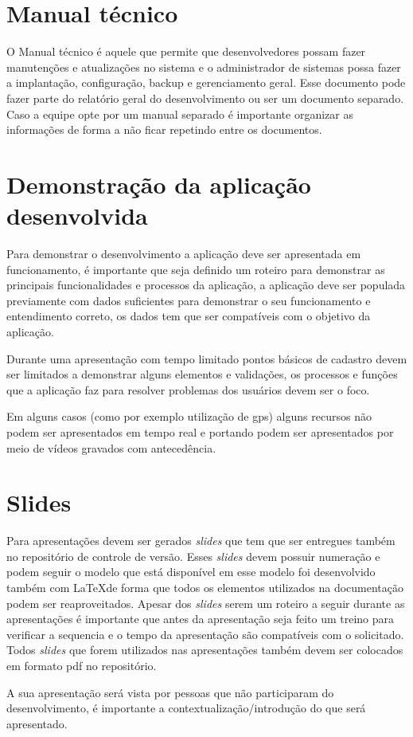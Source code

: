 \section{Manual técnico}\label{atv-manual-tecnico}

O Manual técnico é aquele que permite que desenvolvedores possam fazer manutenções e atualizações no sistema e o administrador de sistemas possa fazer a implantação, configuração, backup e gerenciamento geral. Esse documento pode fazer parte do relatório geral do desenvolvimento ou ser um documento separado. Caso a equipe opte por um manual separado é importante organizar as informações de forma a não ficar repetindo entre os documentos.



\section{Demonstração da aplicação desenvolvida}\label{atv-demonstracao-aplicacao}

Para demonstrar o desenvolvimento a aplicação deve ser apresentada em funcionamento, é importante que seja definido um roteiro para demonstrar as principais funcionalidades e processos da aplicação, a aplicação deve ser populada previamente com dados suficientes para demonstrar o seu funcionamento e entendimento correto, os dados tem que ser compatíveis com o objetivo da aplicação. 

Durante uma apresentação com tempo limitado pontos básicos de cadastro devem ser limitados a demonstrar alguns elementos e validações, os processos e funções que a aplicação faz para resolver problemas dos usuários devem ser o foco.

Em alguns casos (como por exemplo utilização de \ac{gps}) alguns recursos não podem ser apresentados em tempo real e portando podem ser apresentados por meio de vídeos gravados com antecedência.






\section{Slides}\label{atv-slides}
Para apresentações devem ser gerados \emph{slides} que tem que ser entregues também no repositório de controle de versão. Esses \emph{slides} devem possuir numeração e podem seguir o modelo que está disponível em \urlmodeloApresentacao \space esse modelo foi desenvolvido também com \LaTeX \space de forma que todos os elementos utilizados na documentação podem ser reaproveitados. Apesar dos \emph{slides} serem um roteiro a seguir durante as apresentações é importante que antes da apresentação seja feito um treino para verificar a sequencia e o tempo da apresentação são compatíveis com o solicitado. Todos \emph{slides} que forem utilizados nas apresentações também devem ser colocados em formato \ac{pdf} no repositório.

A sua apresentação será vista por pessoas que não participaram do desenvolvimento, é importante a contextualização/introdução do que será apresentado. 

